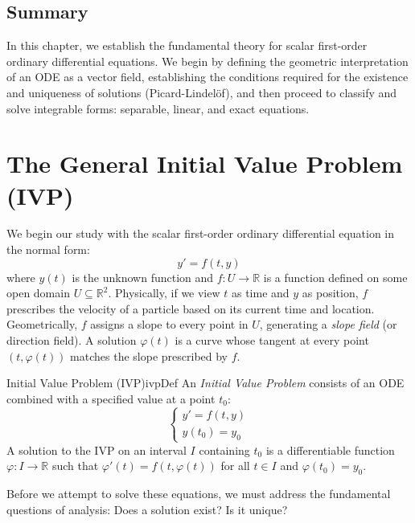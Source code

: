 \documentclass{book}
\newcommand{\R}{{\mathbb{R}}}
\newcommand{\sse}{\subseteq}
\renewcommand{\phi}{\varphi}
\begin{document}
\subsection*{Summary}
In this chapter, we establish the fundamental theory for scalar first-order ordinary differential equations. We begin by defining the geometric interpretation of an ODE as a vector field, establishing the conditions required for the existence and uniqueness of solutions (Picard-Lindelöf), and then proceed to classify and solve integrable forms: separable, linear, and exact equations.

\section{The General Initial Value Problem (IVP)}

We begin our study with the scalar first-order ordinary differential equation in the normal form:
\begin{equation}\label{eq:normalFormODE}
    y' = f(t, y)
\end{equation}
where $y(t)$ is the unknown function and $f: U \to \R$ is a function defined on some open domain $U \sse \R^2$. Physically, if we view $t$ as time and $y$ as position, $f$ prescribes the velocity of a particle based on its current time and location. Geometrically, $f$ assigns a slope to every point in $U$, generating a \emph{slope field} (or direction field). A solution $\phi(t)$ is a curve whose tangent at every point $(t, \phi(t))$ matches the slope prescribed by $f$.

\begin{defn}{Initial Value Problem (IVP)}{ivpDef}
    An \emph{Initial Value Problem} consists of an ODE combined with a specified value at a point $t_0$:
    \[
        \begin{cases}
            y' = f(t, y) \\
            y(t_0) = y_0
        \end{cases}
    \]
    A solution to the IVP on an interval $I$ containing $t_0$ is a differentiable function $\phi: I \to \R$ such that $\phi'(t) = f(t, \phi(t))$ for all $t \in I$ and $\phi(t_0) = y_0$.
\end{defn}

Before we attempt to solve these equations, we must address the fundamental questions of analysis: Does a solution exist? Is it unique?
\end{document}
